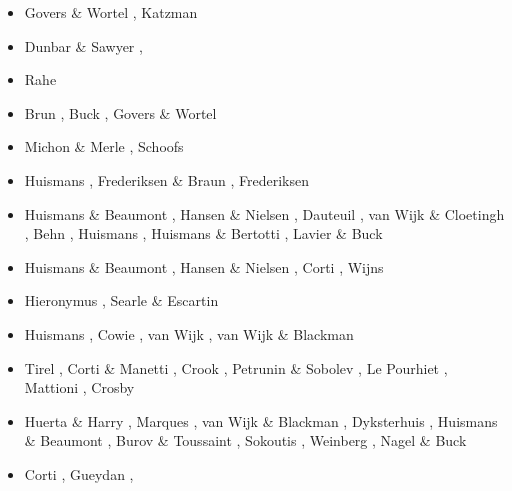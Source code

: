 \begin{scriptsize}
\begin{itemize}
\item[\nineteenninetyfive] Govers \& Wortel \cite{gowo95}, Katzman \etal \cite{katl95}
\item[\nineteenninetysix] Dunbar \& Sawyer \cite{dusa96}, \cite{beda96}\cite{mada96}
\item[\nineteenninetyeight] Rahe \etal \cite{rafm98}
\item[\nineteenninetynine] Brun \cite{brun99}, Buck \etal \cite{bulp99},
                           Govers \& Wortel \cite{gowo99}
\item[\twothousand] Michon \& Merle \cite{mime00}, Schoofs \etal \cite{scth00}
\item[\twothousandone] Huismans \etal \cite{hupc01,hupc01b}, Frederiksen \& Braun \cite{frbr01}, 
                       Frederiksen \etal \cite{frnb01a,frnb01b}
\item[\twothousandtwo] Huismans \& Beaumont \cite{hube02}, Hansen \& Nielsen \cite{hani02},
                       Dauteuil \etal \cite{dabm02}, van Wijk \& Cloetingh \cite{vacl02},
                       Behn \etal \cite{belz02}, Huismans \etal \cite{hupc02},
                       Huismans \& Bertotti \cite{hube02b}, Lavier \& Buck \cite{labu02}
\item[\twothousandthree] Huismans \& Beaumont \cite{hube03}, Hansen \& Nielsen \cite{hani03},
                         Corti \etal \cite{covb03}, Wijns \etal \cite{wibm03}
\item[\twothousandfour] Hieronymus \cite{hier04}, Searle \& Escartin \cite{sees04}
\item[\twothousandfive] Huismans \etal \cite{hubb05}, Cowie \etal \cite{coub05},
                        van Wijk \cite{vanw05}, van Wijk \& Blackman \cite{vabl05}
\item[\twothousandsix] Tirel \etal \cite{tibs06}, Corti \& Manetti \cite{coma06},
                       Crook \etal \cite{crwy06}, Petrunin \& Sobolev \cite{peso06},
                       Le Pourhiet \etal \cite{lemm06}, Mattioni \etal \cite{malm06}, 
                       Crosby \etal \cite{crms06}
\item[\twothousandseven] Huerta \& Harry \cite{huha07}, Marques \etal \cite{macl07},
                         van Wijk \& Blackman \cite{vabl07}, Dyksterhuis \etal \cite{dyrm07},
                         Huismans \& Beaumont \cite{hube07}, Burov \& Toussaint \cite{buto07},
                         Sokoutis \etal \cite{socb07}, Weinberg \etal \cite{werr07},
                         Nagel \& Buck \cite{nabu07}
\item[\twothousandeight] Corti \cite{cort08}, Gueydan \etal \cite{gumb08},

\end{itemize}
\end{scriptsize}
